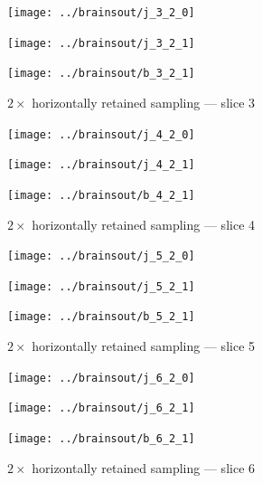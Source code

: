 \documentclass{article}
\begin{document}
\begin{figure}
\begin{centering}

\parbox{\imsizes}{\texttt{[image: ../brainsout/j\_3\_2\_0]}}

\vspace{\vertseps}

\parbox{\imsizes}{\texttt{[image: ../brainsout/j\_3\_2\_1]}}
\hfill
\parbox{\imsizes}{\texttt{[image: ../brainsout/b\_3\_2\_1]}}

\end{centering}
\caption{$2\times$ horizontally retained sampling --- slice 3}
\end{figure}


\begin{figure}
\begin{centering}

\parbox{\imsizes}{\texttt{[image: ../brainsout/j\_4\_2\_0]}}

\vspace{\vertseps}

\parbox{\imsizes}{\texttt{[image: ../brainsout/j\_4\_2\_1]}}
\hfill
\parbox{\imsizes}{\texttt{[image: ../brainsout/b\_4\_2\_1]}}

\end{centering}
\caption{$2\times$ horizontally retained sampling --- slice 4}
\end{figure}


\begin{figure}
\begin{centering}

\parbox{\imsizes}{\texttt{[image: ../brainsout/j\_5\_2\_0]}}

\vspace{\vertseps}

\parbox{\imsizes}{\texttt{[image: ../brainsout/j\_5\_2\_1]}}
\hfill
\parbox{\imsizes}{\texttt{[image: ../brainsout/b\_5\_2\_1]}}

\end{centering}
\caption{$2\times$ horizontally retained sampling --- slice 5}
\end{figure}


\begin{figure}
\begin{centering}

\parbox{\imsizes}{\texttt{[image: ../brainsout/j\_6\_2\_0]}}

\vspace{\vertseps}

\parbox{\imsizes}{\texttt{[image: ../brainsout/j\_6\_2\_1]}}
\hfill
\parbox{\imsizes}{\texttt{[image: ../brainsout/b\_6\_2\_1]}}

\end{centering}
\caption{$2\times$ horizontally retained sampling --- slice 6}
\end{figure}
\end{document}
